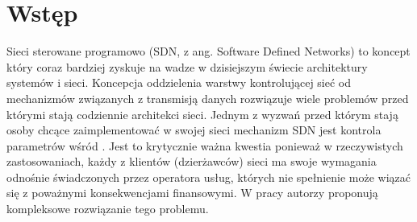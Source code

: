 \section{Wstęp}

Sieci sterowane programowo (SDN, z ang. Software Defined Networks) to koncept który coraz bardziej zyskuje na wadze w dzisiejszym świecie architektury systemów i sieci. Koncepcja oddzielenia warstwy kontrolującej sieć od mechanizmów związanych z transmisją danych rozwiązuje wiele problemów przed którymi stają codziennie architekci sieci. Jednym z wyzwań przed którym stają osoby chcące zaimplementować w swojej sieci mechanizm SDN jest kontrola parametrów wśród . Jest to krytycznie ważna kwestia ponieważ w rzeczywistych zastosowaniach, każdy z klientów (dzierżawców) sieci ma swoje wymagania odnośnie świadczonych przez operatora usług, których nie spełnienie może wiązać się z poważnymi konsekwencjami finansowymi.
W pracy \cite{lin16} autorzy proponują kompleksowe rozwiązanie tego problemu.
